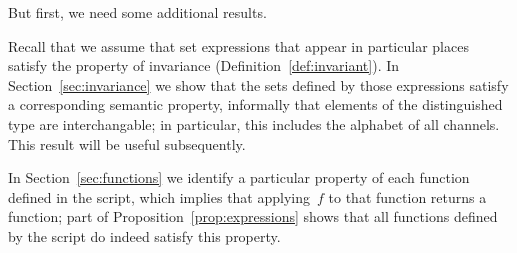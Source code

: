 But first, we need some additional results.  

Recall that we assume that set expressions that appear in particular places
satisfy the property of invariance (Definition~\ref{def:invariant}).  In
Section~\ref{sec:invariance} we show that the sets defined by those
expressions satisfy a corresponding semantic property, informally that
elements of the distinguished type are interchangable; in particular, this
includes the alphabet of all channels.  This result will be useful
subsequently. 

In Section~\ref{sec:functions} we identify a particular property of each
function defined in the script, which implies that applying~$f$ to that
function returns a function; part of Proposition~\ref{prop:expressions} shows
that all functions defined by the script do indeed satisfy this property.

